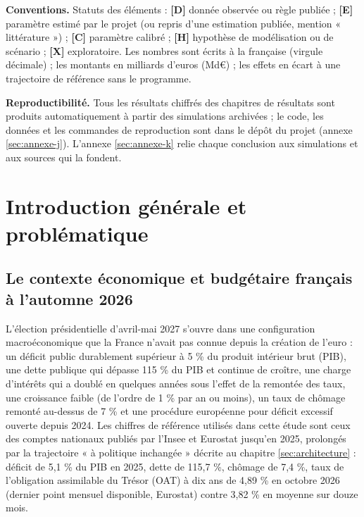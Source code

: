 \documentclass[
  11pt,
  11pt,
  a4paper,
  openany]{book}
\begin{document}
\textbf{Conventions.} Statuts des éléments : \textbf{{[}D{]}} donnée
observée ou règle publiée ; \textbf{{[}E{]}} paramètre estimé par le
projet (ou repris d'une estimation publiée, mention « littérature ») ;
\textbf{{[}C{]}} paramètre calibré ; \textbf{{[}H{]}} hypothèse de
modélisation ou de scénario ; \textbf{{[}X{]}} exploratoire. Les nombres
sont écrits à la française (virgule décimale) ; les montants en
milliards d'euros (Md€) ; les effets en écart à une trajectoire de
référence sans le programme.

\textbf{Reproductibilité.} Tous les résultats chiffrés des chapitres de
résultats sont produits automatiquement à partir des simulations
archivées ; le code, les données et les commandes de reproduction sont
dans le dépôt du projet (annexe \ref{sec:annexe-j}). L'annexe
\ref{sec:annexe-k} relie chaque conclusion aux simulations et aux
sources qui la fondent.

\hypertarget{sec:intro}{%
\chapter{Introduction générale et problématique}\label{sec:intro}}

\hypertarget{sec:contexte}{%
\section{Le contexte économique et budgétaire français à l'automne
2026}\label{sec:contexte}}

L'élection présidentielle d'avril-mai 2027 s'ouvre dans une
configuration macroéconomique que la France n'avait pas connue depuis la
création de l'euro : un déficit public durablement supérieur à 5 \% du
produit intérieur brut (PIB), une dette publique qui dépasse 115 \% du
PIB et continue de croître, une charge d'intérêts qui a doublé en
quelques années sous l'effet de la remontée des taux, une croissance
faible (de l'ordre de 1 \% par an ou moins), un taux de chômage remonté
au-dessus de 7 \% et une procédure européenne pour déficit excessif
ouverte depuis 2024. Les chiffres de référence utilisés dans cette étude
sont ceux des comptes nationaux publiés par l'Insee et Eurostat jusqu'en
2025, prolongés par la trajectoire « à politique inchangée » décrite au
chapitre \ref{sec:architecture} : déficit de 5,1 \% du PIB en 2025,
dette de 115,7 \%, chômage de 7,4 \%, taux de l'obligation assimilable
du Trésor (OAT) à dix ans de 4,89 \% en octobre 2026 (dernier point
mensuel disponible, Eurostat) contre 3,82 \% en moyenne sur douze mois.
\end{document}
